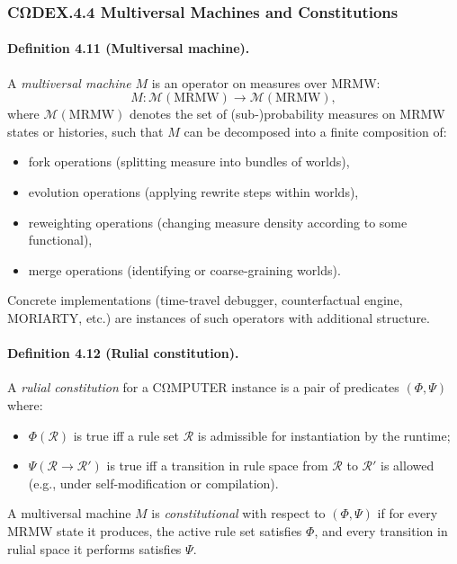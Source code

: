 \subsubsection*{CΩDEX.4.4 \quad Multiversal Machines and Constitutions}

\paragraph{Definition 4.11 (Multiversal machine).}
A \emph{multiversal machine} $M$ is an operator on measures over MRMW:
\[
  M : \mathcal{M}(\text{MRMW}) \to \mathcal{M}(\text{MRMW}),
\]
where $\mathcal{M}(\text{MRMW})$ denotes the set of (sub-)probability
measures on MRMW states or histories, such that $M$ can be decomposed
into a finite composition of:

\begin{itemize}
  \item fork operations (splitting measure into bundles of worlds),
  \item evolution operations (applying rewrite steps within worlds),
  \item reweighting operations (changing measure density according to
        some functional),
  \item merge operations (identifying or coarse-graining worlds).
\end{itemize}

Concrete implementations (time-travel debugger, counterfactual engine,
MORIARTY, etc.) are instances of such operators with additional structure.

\paragraph{Definition 4.12 (Rulial constitution).}
A \emph{rulial constitution} for a CΩMPUTER instance is a pair of
predicates $(\Phi,\Psi)$ where:

\begin{itemize}
  \item $\Phi(\mathcal{R})$ is true iff a rule set $\mathcal{R}$ is
        admissible for instantiation by the runtime;
  \item $\Psi(\mathcal{R}\to\mathcal{R}')$ is true iff a transition in
        rule space from $\mathcal{R}$ to $\mathcal{R}'$ is allowed
        (e.g., under self-modification or compilation).
\end{itemize}

A multiversal machine $M$ is \emph{constitutional} with respect to
$(\Phi,\Psi)$ if for every MRMW state it produces, the active rule set
satisfies $\Phi$, and every transition in rulial space it performs
satisfies $\Psi$.


